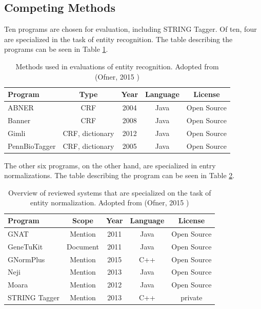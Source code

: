 \subsection{Competing Methods}


Ten programs are chosen for evaluation, including STRING Tagger. Of ten, four are specialized in the task of entity recognition. The table describing the programs can be seen in Table \ref{fig:TaggingMethods}.

\begin{table}[htbp]
\caption{Methods used in evaluations of entity recognition. Adopted from (Ofner, 2015 \citep{ofner2015evaluation})}
\centering
\begin{tabular}{ l c c c c }
  \hline
  Program & Type & Year & Language & License\\
  \hline
  \hline
  ABNER & CRF & 2004 & Java & Open Source\\
  \hline
  Banner & CRF & 2008 & Java & Open Source\\
  \hline
  Gimli & CRF, dictionary & 2012 & Java & Open Source\\
  \hline
  PennBioTagger & CRF, dictionary & 2005 & Java & Open Source\\
  \hline
\end{tabular}
  \label{fig:TaggingMethods}
\end{table}

The other six programs, on the other hand, are specialized in entry normalizations. The table describing the program can be seen in Table \ref{fig:NormalizationMethods}.

\begin{table}[htbp]
\caption{Overview of reviewed systems that are specialized on the task of entity normalization. Adopted from (Ofner, 2015 \citep{ofner2015evaluation})}
\centering
\begin{tabular}{ l c c c c }
  \hline
  Program & Scope & Year & Language & License\\
  \hline
  \hline
  GNAT & Mention & 2011 & Java & Open Source\\
  \hline
  GeneTuKit & Document & 2011 & Java & Open Source\\
  \hline
  GNormPlus & Mention & 2015 & C++ & Open Source\\
  \hline
  Neji & Mention & 2013 & Java & Open Source\\
  \hline
  Moara & Mention & 2012 & Java & Open Source\\
  \hline
  STRING Tagger & Mention & 2013 & C++ & private\\
  \hline
\end{tabular}
  \label{fig:NormalizationMethods}
\end{table}


